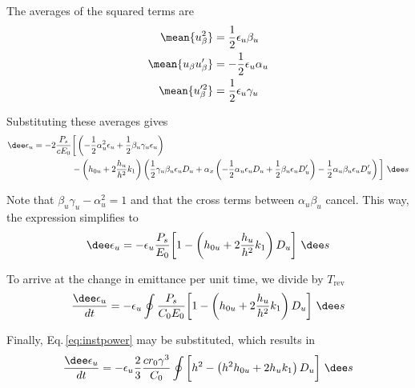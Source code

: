 The averages of the squared terms are
\begin{align}
    \mean{u_\beta^2}        &=   \frac{1}{2} \epsilon_u \beta_u\\
    \mean{u_\beta u_\beta'} &= - \frac{1}{2} \epsilon_u \alpha_u\\
    \mean{u_\beta'^2}       &=   \frac{1}{2} \epsilon_u \gamma_u
\end{align}

Substituting these averages gives
\begin{align}
    \dee \epsilon_u = - 2 \frac{P_s}{cE_0} &\bigg[ \left( - \frac{1}{2} \alpha_u^2 \epsilon_u + \frac{1}{2} \beta_u \gamma_u \epsilon_u \right) \notag \\
    &- \left( h_{0u} + 2 \frac{h_u}{h^2} k_1 \right) \left( \frac{1}{2} \gamma_u \beta_u \epsilon_u D_u  + \alpha_x \left(-\frac{1}{2} \alpha_u \epsilon_u D_u + \frac{1}{2} \beta_u \epsilon_u D_u' \right) - \frac{1}{2} \alpha_u \beta_u \epsilon_u D_u' \right) \bigg]\ \dee s
\end{align}

Note that $\beta_u \gamma_u - \alpha_u^2 = 1$ and that the cross terms between $\alpha_u\beta_u$ cancel. This way, the expression simplifies to
\begin{align}
    \dee \epsilon_u = - \epsilon_u \frac{P_s}{E_0} \bigg[ 1 - \left( h_{0u} + 2 \frac{h_u}{h^2} k_1 \right) D_u \bigg]\ \dee s
\end{align}

To arrive at the change in emittance per unit time, we divide by $T_\text{rev}$
%
%
\begin{equation}
    \frac{\dee \epsilon_u}{dt} = - \epsilon_u \oint \frac{P_s}{C_0 E_0} \bigg[ 1 - \left( h_{0u} + 2 \frac{h_u}{h^2} k_1 \right) D_u \bigg]\ \dee s
\end{equation}

Finally, Eq.\,\ref{eq:instpower} may be substituted, which results in
\begin{equation}
    \frac{\dee \epsilon_u}{dt} = - \epsilon_u \frac{2}{3} \frac{c r_0 \gamma^3}{C_0} \oint \bigg[ h^2 - \left( h^2 h_{0u} + 2 h_u k_1 \right) D_u \bigg]\ \dee s
\end{equation}

